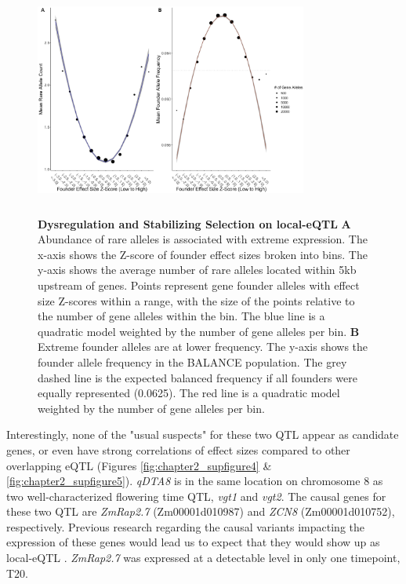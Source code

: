\documentclass[article,9pt,twocolumn,twoside]{rilabRxiv}
\begin{document}
\begin{figure}[!ht]
\centering
\includegraphics[width=0.8\textwidth,height=3in]{figures/chapter2_figure4.png}
\caption{\textbf{Dysregulation and Stabilizing Selection on local-eQTL} \textbf{A} Abundance of rare alleles is associated with extreme expression.
The x-axis shows the Z-score of founder effect sizes broken into bins.
The y-axis shows the average number of rare alleles located within 5kb upstream of genes.
Points represent gene founder alleles with effect size Z-scores within a range, with the size of the points relative to the number of gene alleles within the bin.
The blue line is a quadratic model weighted by the number of gene alleles per bin.
\textbf{B} Extreme founder alleles are at lower frequency.
The y-axis shows the founder allele frequency in the BALANCE population.
The grey dashed line is the expected balanced frequency if all founders were equally represented (0.0625).
The red line is a quadratic model weighted by the number of gene alleles per bin.}
\label{fig:smile_frownfigure}
\end{figure}
Interestingly, none of the "usual suspects" for these two QTL appear as candidate genes, or even have strong correlations of effect sizes compared to other overlapping eQTL (Figures \ref{fig:chapter2_supfigure4} \& \ref{fig:chapter2_supfigure5}).
\textit{qDTA8} is in the same location on chromosome 8 as two well-characterized flowering time QTL, \textit{vgt1} and \textit{vgt2}.
The causal genes for these two QTL are \textit{ZmRap2.7} (Zm00001d010987) and \textit{ZCN8} (Zm00001d010752), respectively.
Previous research regarding the causal variants impacting the expression of these genes would lead us to expect that they would show up as local-eQTL \citep{Guo,Castelletti}.
\textit{ZmRap2.7} was expressed at a detectable level in only one timepoint, T20.
\end{document}
